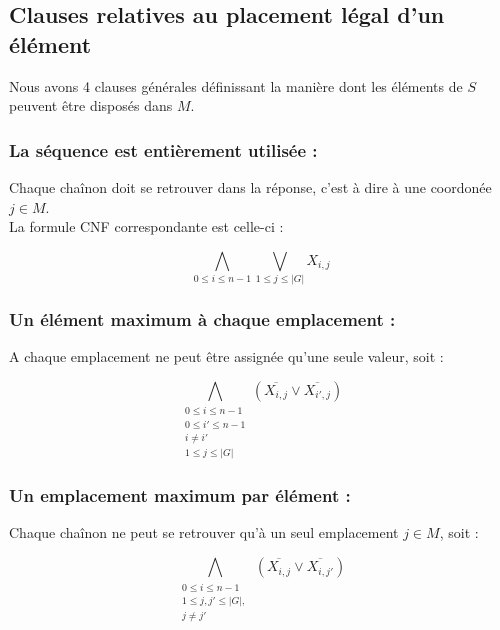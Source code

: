 \documentclass[utf8]{article}
\begin{document}
\subsection{Clauses relatives au placement légal d'un élément}
Nous avons 4 clauses générales définissant la manière dont les éléments de $S$ peuvent être disposés dans $M$.

\subsubsection{La séquence est entièrement utilisée :}
Chaque chaînon doit se retrouver dans la réponse, c'est à dire à une coordonée $j \in M$. \\
La formule CNF correspondante est celle-ci : \\

\begin{center}
    \[ \bigwedge_{0\leq i\leq n-1}\bigvee_{1\leq j\leq |G|} X_{i,j} \]
\end{center}

\subsubsection{Un élément maximum à chaque emplacement :}
A chaque emplacement ne peut être assignée qu'une seule valeur, soit :\\


\begin{center}
    \[ \bigwedge_{\substack{0\leq i\leq n-1
    \\0\leq i'\leq n-1
    \\i\neq i'
    \\1\leq j\leq |G|}} (\overline{X_{i,j}} \vee \overline{X_{i',j}}) \]
\end{center}

\subsubsection{Un emplacement maximum par élément :}
Chaque chaînon ne peut se retrouver qu'à un seul emplacement $j \in M$, soit : \\


\begin{center}
    \[ \bigwedge_{\substack{0\leq i\leq n-1
    \\1\leq j , j'\leq |G|,\>
    \\ j\neq j'}} (\overline{X_{i,j}} \vee \overline{X_{i,j'}}) \]
\end{center}
\end{document}
